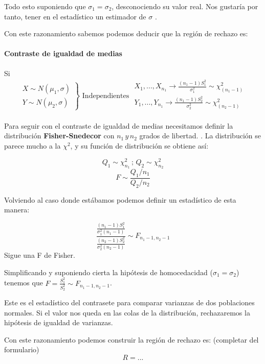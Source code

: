 \documentclass{apuntes}
\begin{document}
Todo esto suponiendo que $\sigma_1=\sigma_2$, desconociendo su valor real. Nos gustaría por tanto, tener en el estadístico un estimador de $\sigma$ .

Con este razonamiento sabemos podemos deducir que la región de rechazo es:


\paragraph{Contraste de igualdad de medias}
Si \[\left.\begin{array}{cc}
X\sim N(\mu_1,\sigma)\\
Y\sim N(\mu_2,\sigma)
\end{array}\right\}\text{ Independientes } \begin{array}{c}
X_1,...,X_{n_1}\to \frac{(n_1-1)S_1^2}{\sigma_1^2} \sim \chi^2_{(n_1-1)}\\
Y_1,...,Y_{n_1}\to \frac{(n_1-1)S_2^2}{\sigma_2^2} \sim \chi^2_{(n_2-1)}\\
\end{array}\]

Para seguir con el contraste de igualdad de medias necesitamos definir la distribución \textbf{Fisher-Snedecor} con $n_1\,y\,n_2$ grados de libertad. . La distribución se parece mucho a la $\chi^2$, y su función de distribución se obtiene así:

\[Q_1 \sim \chi_{n_1}^2 \,;\, Q_2 \sim \chi_{n_2}^2\]
\[F \sim\displaystyle \frac{\displaystyle Q_1/n_1}{\displaystyle Q_2/n_2}\]

Volviendo al caso donde estábamos podemos definir un estadístico de esta manera:

\[\frac{\frac{(n_1-1)S_1^2}{\sigma_1^2(n_1-1)}}{\frac{(n_2-1)S_2^2}{\sigma_2^2 (n_2-1)}} \sim F_{n_1-1,n_2-1}\]
Sigue una F de Fisher.

Simplificando y suponiendo cierta la hipótesis de homocedacidad ($\sigma_1 = \sigma_2$) tenemos que $F = \displaystyle \frac{S_1^2}{S_2^2} \sim F_{n_1-1,n_2-1}$. 

Este es el estadístico del contrasete para comparar varianzas de dos poblaciones normales. Si el valor nos queda en las colas de la distribución, rechazaremos la hipótesis de igualdad de varianzas.

Con este razonamiento podemos construir la región de rechazo es: 
(completar del formulario)
\[R = ...\]
\end{document}
